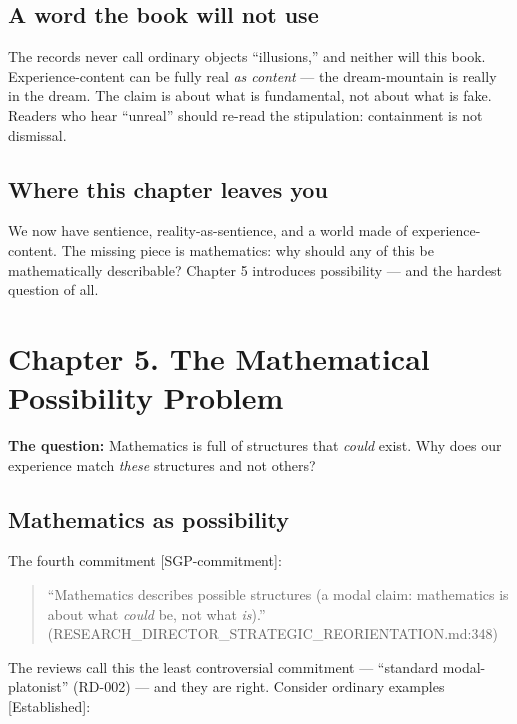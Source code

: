 \documentclass[
  11pt,
]{book}
\begin{document}
\section{A word the book will not
use}\label{a-word-the-book-will-not-use}

The records never call ordinary objects ``illusions,'' and neither will
this book. Experience-content can be fully real \emph{as content} ---
the dream-mountain is really in the dream. The claim is about what is
fundamental, not about what is fake. Readers who hear ``unreal'' should
re-read the stipulation: containment is not dismissal.

\section{Where this chapter leaves
you}\label{where-this-chapter-leaves-you-3}

We now have sentience, reality-as-sentience, and a world made of
experience-content. The missing piece is mathematics: why should any of
this be mathematically describable? Chapter 5 introduces possibility ---
and the hardest question of all.

\newpage

\chapter{Chapter 5. The Mathematical Possibility
Problem}\label{chapter-5.-the-mathematical-possibility-problem}

\textbf{The question:} Mathematics is full of structures that
\emph{could} exist. Why does our experience match \emph{these}
structures and not others?

\section{Mathematics as possibility}\label{mathematics-as-possibility}

The fourth commitment {[}SGP-commitment{]}:

\begin{quote}
``Mathematics describes possible structures (a modal claim: mathematics
is about what \emph{could} be, not what \emph{is}).''
(RESEARCH\_DIRECTOR\_STRATEGIC\_REORIENTATION.md:348)
\end{quote}

The reviews call this the least controversial commitment --- ``standard
modal-platonist'' (RD-002) --- and they are right. Consider ordinary
examples {[}Established{]}:
\end{document}
